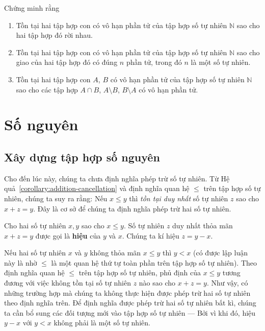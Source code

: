 \begin{exercise}
    Chứng minh rằng
    \begin{enumerate}[label={(\roman*)}]
        \item Tồn tại hai tập hợp con có vô hạn phần tử của tập hợp số tự nhiên $\mathbb{N}$ sao cho hai tập hợp đó rời nhau.
        \item Tồn tại hai tập hợp con có vô hạn phần tử của tập hợp số tự nhiên $\mathbb{N}$ sao cho giao của hai tập hợp đó có đúng $n$ phần tử, trong đó $n$ là một số tự nhiên.
        \item Tồn tại hai tập hợp con $A$, $B$ có vô hạn phần tử của tập hợp số tự nhiên $\mathbb{N}$ sao cho các tập hợp $A\cap B$, $A\setminus B$, $B\setminus A$ có vô hạn phần tử.
    \end{enumerate}
\end{exercise}

\section{Số nguyên}

\subsection{Xây dựng tập hợp số nguyên}

Cho đến lúc này, chúng ta chưa định nghĩa phép trừ số tự nhiên. Từ Hệ quả~\ref{corollary:addition-cancellation} và định nghĩa quan hệ $\leq$ trên tập hợp số tự nhiên, chúng ta suy ra rằng: Nếu $x\leq y$ thì \textit{tồn tại duy nhất} số tự nhiên $z$ sao cho $x + z = y$. Đây là cơ sở để chúng ta định nghĩa phép trừ hai số tự nhiên.

\begin{definition}
    Cho hai số tự nhiên $x, y$ sao cho $x\leq y$. Số tự nhiên $z$ duy nhất thỏa mãn $x + z = y$ được gọi là \textbf{hiệu} của $y$ và $x$. Chúng ta kí hiệu $z = y - x$.
\end{definition}

Nếu hai số tự nhiên $x$ và $y$ không thỏa mãn $x\leq y$ thì $y < x$ (có được lập luận này là nhờ $\leq$ là một quan hệ thứ tự toàn phần trên tập hợp số tự nhiên). Theo định nghĩa quan hệ $\leq$ trên tập hợp số tự nhiên, phủ định của $x\leq y$ tương đương với việc không tồn tại số tự nhiên $z$ nào sao cho $x + z = y$. Như vậy, có những trường hợp mà chúng ta không thực hiện được phép trừ hai số tự nhiên theo định nghĩa trên. Để định nghĩa được phép trừ hai số tự nhiên bất kì, chúng ta cần bổ sung các đối tượng mới vào tập hợp số tự nhiên --- Bởi vì khi đó, hiệu $y - x$ với $y < x$ không phải là một số tự nhiên.

